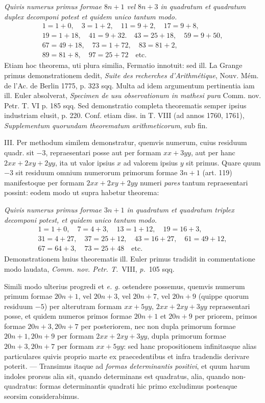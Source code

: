 \textit{Quivis numerus primus formae $8n+1$ vel $8n+3$ in quadratum et quadratum duplex decomponi potest et quidem unico tantum modo.}
\[
\begin{gathered}
1=1+0,\quad3=1+2,\quad11=9+2,\quad17=9+8,\\
19=1+18,\quad41=9+32.\quad43=25+18,\quad59=9+50,\\
67=49+18,\quad73=1+72,\quad83=81+2,\\
89=81+8,\quad97=25+72\quad\text{etc.}
\end{gathered}
\]
Etiam hoc theorema, uti plura similia, Fermatio innotuit: sed ill. La Grange primus demonstrationem dedit, \textit{Suite des recherches d'Arithmétique}, Nouv. Mém. de l'Ac. de Berlin 1775, p. 323 sqq. Multa ad idem argumentum pertinentia iam ill. Euler absolverat, \textit{Specimen de usu observationum in mathesi pura} Comm. nov. Petr. T. VI p. 185 sqq. Sed demonstratio completa theorematis semper ipsius industriam elusit, p. 220. Conf. etiam diss. in T. VIII (ad annos 1760, 1761), \textit{Supplementum quorundam theorematum arithmeticorum}, sub fin.

III. Per methodum similem demonstratur, quemvis numerum, cuius residuum quadr. sit $-3$, repraesentari posse aut per formam $xx+3yy$, aut per hanc $2xx+2xy+2yy$, ita ut valor ipsius $x$ ad valorem ipsius $y$ sit primus. Quare quum $-3$ sit residuum omnium numerorum primorum formae $3n+1$ (art. 119) manifestoque per formam $2xx+2xy+2yy$ numeri \textit{pares} tantum repraesentari possint: eodem modo ut supra habetur theorema:

\textit{Quivis numerus primus formae $3n+1$ in quadratum et quadratum triplex decomponi potest, et quidem unico tantum modo.}
\[
\begin{gathered}
1=1+0,\quad7=4+3,\quad13=1+12,\quad19=16+3,\\
31=4+27,\quad37=25+12,\quad43=16+27,\quad61=49+12,\\
67=64+3,\quad73=25+48\quad\text{etc.}
\end{gathered}
\]
Demonstrationem huius theorematis ill. Euler primus tradidit in commentatione modo laudata, \textit{Comm. nov. Petr. T.}\ VIII, \textit{p.}\ 105 sqq.

Simili modo ulterius progredi et \textit{e. g.} ostendere possemus, quemvis numerum primum formae $20n+1$, vel $20n+3$, vel $20n+7$, vel $20n+9$ (quippe quorum residuum $-5$) per alterutram formam $xx+5yy$, $2xx+2xy+3yy$ repraesentari posse, et quidem numeros primos formae $20n+1$ et $20n+9$ per priorem, primos formae $20n+3,20n+7$ per posteriorem, nec non dupla primorum formae $20n+1,20n+9$ per formam $2xx+2xy+3yy$, dupla primorum formae $20n+3,20n+7$ per formam $xx+5yy$: sed hanc propositionem infinitasque alias particulares quivis proprio marte ex praecedentibus et infra
tradendis derivare poterit. --- Transimus itaque ad \textit{formas determinantis positivi}, et quum harum indoles prorsus alia sit, quando determinans est quadratus, alia, quando non-quadratus: formas determinantis quadrati hic primo excludimus posteaque seorsim considerabimus.

